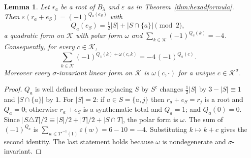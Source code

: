 \documentclass[12pt,a4paper]{amsart}
\newtheorem{lemma}[theorem]{Lemma}
\theoremstyle{definition}
\newcommand{\eps}{\varepsilon}
\newcommand{\Kk}{\mathcal{K}}
\begin{document}
\begin{lemma}\label{lem:Qa}
Let $r_a$ be a root of $B_\lambda$ and $\eps$ as in Theorem~\ref{thm:hexadformula}. Then $\eps(r_a+e_S)=(-1)^{Q_a(e_S)}$ with
\[
Q_a(e_S)=\tfrac12|S|+|S\cap\{a\}|\pmod2,
\]
a quadratic form on $\Kk$ with polar form $\omega$ and $\sum_{k\in\Kk}(-1)^{Q_a(k)}=-4$. Consequently, for every $c\in\Kk$,
\[
\sum_{k\in\Kk}(-1)^{Q_a(k)+\omega(c,k)}=-4\,(-1)^{Q_a(c)} .
\]
Moreover every $\sigma$-invariant linear form on $\Kk$ is $\omega(c,\cdot)$ for a unique $c\in\Kk^\sigma$.
\end{lemma}
\begin{proof}
$Q_a$ is well defined because replacing $S$ by $S^c$ changes $\frac12|S|$ by $3-|S|\equiv1$ and $|S\cap\{a\}|$ by $1$. For $|S|=2$: if $a\in S=\{a,j\}$ then $r_a+e_S=r_j$ is a root and $Q_a=0$; otherwise $r_a+e_S$ is a synthematic total and $Q_a=1$; and $Q_a(0)=0$. Since $|S\triangle T|/2\equiv|S|/2+|T|/2+|S\cap T|$, the polar form is $\omega$. The sum of $(-1)^{Q_a}$ is $\sum_{w\in T'^{-1}(1)}\eps(w)=6-10=-4$. Substituting $k\mapsto k+c$ gives the second identity. The last statement holds because $\omega$ is nondegenerate and $\sigma$-invariant.
\end{proof}
\end{document}

